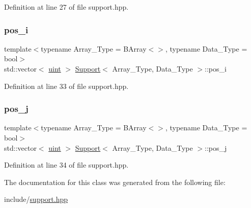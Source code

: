 Definition at line 27 of file support.\+hpp.

\mbox{\label{class_support_a8e3b2d36d26bb771d1a49dfaad75b966}} 
\subsubsection{\texorpdfstring{pos\+\_\+i}{pos\_i}}
{\footnotesize\ttfamily template$<$typename Array\+\_\+\+Type = B\+Array$<$$>$, typename Data\+\_\+\+Type = bool$>$ \\
std\+::vector$<$ \hyperlink{typedefs_8hpp_a91ad9478d81a7aaf2593e8d9c3d06a14}{uint} $>$ \hyperlink{class_support}{Support}$<$ Array\+\_\+\+Type, Data\+\_\+\+Type $>$\+::pos\+\_\+i}



Definition at line 33 of file support.\+hpp.

\mbox{\label{class_support_ac256816f09e47a843cf478a470223a5b}} 
\subsubsection{\texorpdfstring{pos\+\_\+j}{pos\_j}}
{\footnotesize\ttfamily template$<$typename Array\+\_\+\+Type = B\+Array$<$$>$, typename Data\+\_\+\+Type = bool$>$ \\
std\+::vector$<$ \hyperlink{typedefs_8hpp_a91ad9478d81a7aaf2593e8d9c3d06a14}{uint} $>$ \hyperlink{class_support}{Support}$<$ Array\+\_\+\+Type, Data\+\_\+\+Type $>$\+::pos\+\_\+j}



Definition at line 34 of file support.\+hpp.



The documentation for this class was generated from the following file\+:\begin{DoxyCompactItemize}
\item 
include/\hyperlink{support_8hpp}{support.\+hpp}\end{DoxyCompactItemize}
